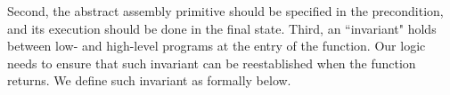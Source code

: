 Second, the abstract assembly primitive should be
specified in the precondition, and its execution
should be done in the final state.
Third, an ``invariant" holds
between low- and high-level programs at the entry of
the function. Our logic needs to ensure that such invariant
can be reestablished when the function returns.
% 
We define such invariant as \INV{} formally below.
